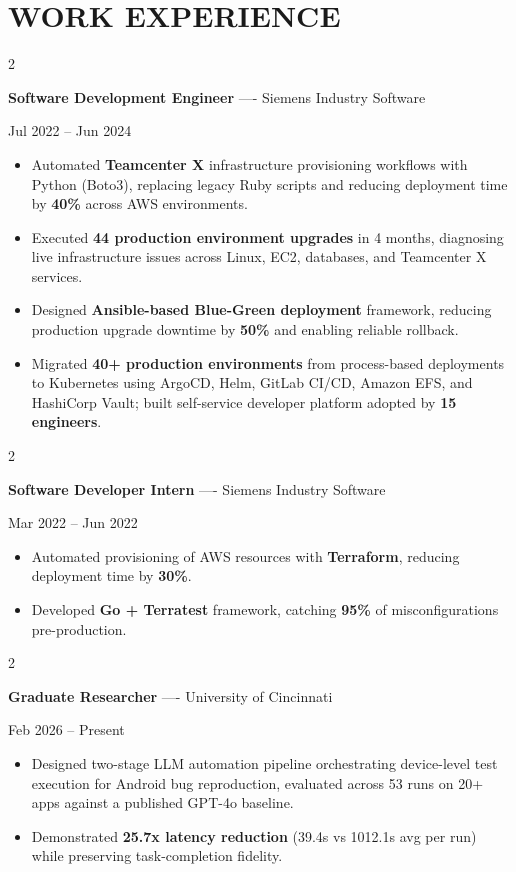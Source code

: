 \documentclass[10pt, letterpaper]{article}
\newenvironment{highlights}{
    \begin{itemize}[
        topsep=0.10 cm,
        parsep=0.06 cm,
        partopsep=0pt,
        itemsep=0.06 cm,
        leftmargin=12pt
    ]
}{
    \end{itemize}
}
\newenvironment{twocolentry}[2][]{
    \onecolentry
    \def\secondColumn{#2}
    \setcolumnwidth{\fill, 4.5 cm}
    \begin{paracol}{2}
}{
    \switchcolumn \raggedleft \secondColumn
    \end{paracol}
    \endonecolentry
}
\begin{document}
\section{WORK EXPERIENCE}
\begin{twocolentry}{Jul 2022 -- Jun 2024}
\textbf{Software Development Engineer} ---- Siemens Industry Software
\end{twocolentry}
\begin{highlights}
  \item Automated \textbf{Teamcenter X} infrastructure provisioning workflows with Python (Boto3), replacing legacy Ruby scripts and reducing deployment time by \textbf{40\%} across AWS environments.
  \item Executed \textbf{44 production environment upgrades} in 4 months, diagnosing live infrastructure issues across Linux, EC2, databases, and Teamcenter X services.
  \item Designed \textbf{Ansible-based Blue-Green deployment} framework, reducing production upgrade downtime by \textbf{50\%} and enabling reliable rollback.
  \item Migrated \textbf{40+ production environments} from process-based deployments to Kubernetes using ArgoCD, Helm, GitLab CI/CD, Amazon EFS, and HashiCorp Vault; built self-service developer platform adopted by \textbf{15 engineers}.
\end{highlights}

\vspace{0.15 cm}

\begin{twocolentry}{Mar 2022 -- Jun 2022}
\textbf{Software Developer Intern} ---- Siemens Industry Software
\end{twocolentry}
\begin{highlights}
  \item Automated provisioning of AWS resources with \textbf{Terraform}, reducing deployment time by \textbf{30\%}.
  \item Developed \textbf{Go + Terratest} framework, catching \textbf{95\%} of misconfigurations pre-production.
\end{highlights}

\vspace{0.15 cm}

\begin{twocolentry}{Feb 2026 -- Present}
\textbf{Graduate Researcher} ---- University of Cincinnati
\end{twocolentry}
\begin{highlights}
  \item Designed two-stage LLM automation pipeline orchestrating device-level test execution for Android bug reproduction, evaluated across 53 runs on 20+ apps against a published GPT-4o baseline.
  \item Demonstrated \textbf{25.7x latency reduction} (39.4s vs 1012.1s avg per run) while preserving task-completion fidelity.
\end{highlights}
\end{document}
